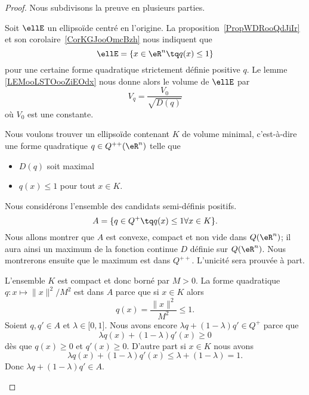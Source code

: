 \begin{proof}
	Nous subdivisons la preuve en plusieurs parties.
	\begin{subproof}
		Soit \( \ellE\) un ellipsoïde centré en l'origine. La proposition~\ref{PropWDRooQdJiIr} et son corolaire~\ref{CorKGJooOmcBzh} nous indiquent que
		\begin{equation}
			\ellE=\{ x\in \eR^n\tq q(x)\leq 1 \}
		\end{equation}
		pour une certaine forme quadratique strictement définie positive \( q\). Le lemme \ref{LEMooLSTOooZiEOdx} nous donne alors le volume de \( \ellE\) par
		\begin{equation}
			V_q=\frac{ V_0 }{ \sqrt{ D(q) } }
		\end{equation}
		où \( V_0\) est une constante.

		Nous voulons trouver un ellipsoïde contenant \( K\) de volume minimal, c'est-à-dire une forme quadratique \( q\in Q^{++}(\eR^n)\) telle que
		\begin{itemize}
			\item \( D(q)\) soit maximal
			\item \( q(x)\leq 1\) pour tout \( x\in K\).
		\end{itemize}
		Nous considérons l'ensemble des candidats semi-définis positifs.
		\begin{equation}
			A=\{ q\in Q^+\tq q(x)\leq 1\forall x\in K \}.
		\end{equation}
		Nous allons montrer que \( A\) est convexe, compact et non vide dans \( Q(\eR^n)\); il aura ainsi un maximum de la fonction continue \( D\) définie sur \( Q(\eR^n)\). Nous montrerons ensuite que le maximum est dans \( Q^{++}\). L'unicité sera prouvée à part.

		\begin{subproof}
			L'ensemble \( K\) est compact et donc borné par \( M>0\). La forme quadratique \( q\colon x\mapsto \| x \|^2/M^2\) est dans \( A\) parce que si \( x\in K\) alors
			\begin{equation}
				q(x)=\frac{ \| x \|^2 }{ M^2 }\leq 1.
			\end{equation}
			\spitem[Convexe]
			Soient \( q,q'\in A\) et \( \lambda\in\mathopen[ 0 , 1 \mathclose]\). Nous avons encore \( \lambda q+(1-\lambda)q'\in Q^+\) parce que
			\begin{equation}
				\lambda q(x)+(1-\lambda)q'(x)\geq 0
			\end{equation}
			dès que \( q(x)\geq 0\) et \( q'(x)\geq 0\).
			D'autre part si \( x\in K\) nous avons
			\begin{equation}
				\lambda q(x)+(1-\lambda)q'(x)\leq \lambda+(1-\lambda)=1.
			\end{equation}
			Donc \( \lambda q+(1-\lambda)q'\in A\).


\end{subproof}
\end{subproof}
\end{proof}
